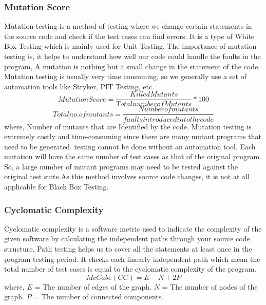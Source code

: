 \documentclass[letterpaper, 12 pt, conference]{ieeetran}  %
\begin{document}
\subsubsection{Mutation Score} Mutation testing is a method of testing where we change certain statements in the
source code and check if the test cases can find errors. It is a type of White Box Testing
which is mainly used for Unit Testing.
The importance of mutation testing is, it helps to understand how well our code could
handle the faults in the program, A mutation is nothing but a small change in the
statement of the code.
Mutation testing is usually very time consuming, so we generally use a set of
automation tools like Stryker, PIT Testing, etc.
\small\[Mutation Score = \dfrac{Killed Mutants}{Total number of Mutants}*100\]
\small\[ Total no. of mutants = \dfrac{Number of mutants}{faults introduced into the code}\]
where, Number of mutants that are Identified
by the code.
Mutation testing is extremely costly and time-consuming since there are many mutant programs that need to be generated. testing cannot be done without an automation tool. Each mutation will have the same number of test cases as that of the original program. So, a large number of mutant programs may need to be tested against the original test suite.As this method involves source code changes, it is not at all applicable for Black Box Testing.
\\
\subsubsection{Cyclomatic Complexity} Cyclomatic complexity is a software metric used to indicate the complexity of the given
software by calculating the independent paths through your source code structure.
Path testing helps us to cover all the statements at least once in the program testing
period. It checks each linearly independent path which mean the total number of test
cases is equal to the cyclomatic complexity of the program.
\[McCabe(CC) = E-N+2P\]
where, $E$ = The number of edges of the graph.
$N$ = The number of nodes of the graph.
$P$ = The number of connected components.
\\
\end{document}

